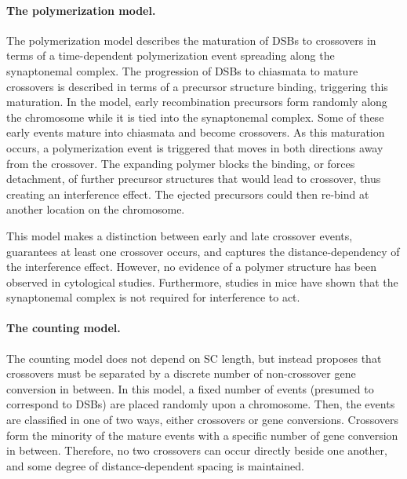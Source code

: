 \paragraph{The polymerization model.}
The polymerization model describes the maturation of DSBs to crossovers in terms of a time-dependent polymerization event spreading along the synaptonemal complex\cite{King1990}.
The progression of DSBs to chiasmata to mature crossovers is described in terms of a precursor structure binding, triggering this maturation.
In the model, early recombination precursors form randomly along the chromosome while it is tied into the synaptonemal complex.
Some of these early events mature into chiasmata and become crossovers.
As this maturation occurs, a polymerization event is triggered that moves in both directions away from the crossover.
The expanding polymer blocks the binding, or forces detachment, of further precursor structures that would lead to crossover, thus creating an interference effect.
The ejected precursors could then re-bind at another location on the chromosome.

This model makes a distinction between early and late crossover events, guarantees at least one crossover occurs, and captures the distance-dependency of the interference effect.
However, no evidence of a polymer structure has been observed in cytological studies.
Furthermore, studies in mice have shown that the synaptonemal complex is not required for interference to act\cite{DeBoer2007}.


\paragraph{The counting model.}
The counting model does not depend on SC length, but instead proposes that crossovers must be separated by a discrete number of non-crossover gene conversion in between\cite{Foss1993,Foss1995}.
In this model, a fixed number of events (presumed to correspond to DSBs) are placed randomly upon a chromosome.
Then, the events are classified in one of two ways, either crossovers or gene conversions.
Crossovers form the minority of the mature events with a specific number of gene conversion in between.
Therefore, no two crossovers can occur directly beside one another, and some degree of distance-dependent spacing is maintained.

